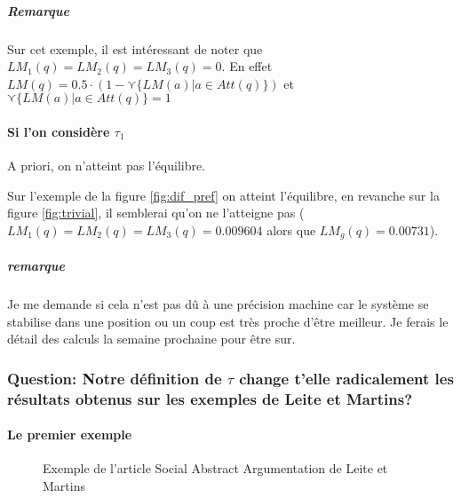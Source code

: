 \documentclass[12pt]{article}
\theoremstyle{defi}
\theoremstyle{not}
\theoremstyle{prob}
\begin{document}
          \subparagraph{Remarque\\}
            Sur cet exemple, il est intéressant de noter que $LM_1(q) = LM_2(q) = LM_3(q) = 0$.
            En effet $LM(q) = 0.5 \cdot (1 - \curlyvee \{LM(a) | a\in Att(q)\})$ et $\curlyvee \{LM(a) | a\in Att(q)\} = 1$


        \paragraph{Si l'on considère $\tau_1$\\}
          A priori, on n'atteint pas l'équilibre.

          Sur l'exemple de la figure \ref{fig:dif_pref} on atteint l'équilibre, en revanche sur la figure \ref{fig:trivial}, il semblerai qu'on ne l'atteigne pas ($LM_1(q) = LM_2(q) = LM_3(q) = 0.009604$ alors que $LM_g(q) = 0.00731$).

          \subparagraph{remarque\\} Je me demande si cela n'est pas dû à une précision machine car le système se stabilise dans une position ou un coup est très proche d'être meilleur.
            Je ferais le détail des calculs la semaine prochaine pour être sur.

      \subsubsection{Question: Notre définition de $\tau$ change t'elle radicalement les résultats obtenus sur les exemples de Leite et Martins?}

        \paragraph{Le premier exemple\\}

          \begin{figure}
            \centering
            \caption{Exemple de l'article Social Abstract Argumentation de Leite et Martins}
            \label{fig:LM_example}
          \end{figure}
\end{document}
